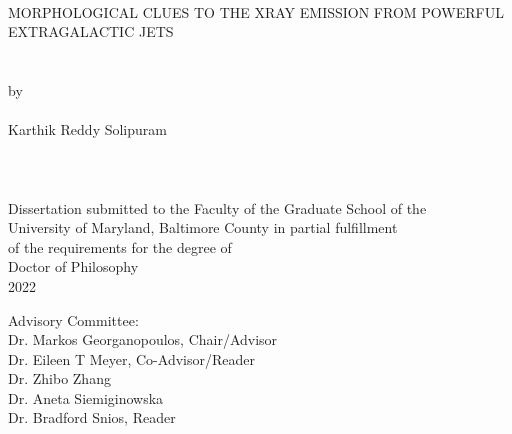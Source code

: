 
\thispagestyle{empty}
\hbox{\ }
\vspace{1in}
\renewcommand{\baselinestretch}{1}
\small\normalsize
\begin{center}

\large{{MORPHOLOGICAL CLUES TO THE XRAY EMISSION FROM POWERFUL EXTRAGALACTIC JETS}}\\
\ \\
\ \\
\large{by} \\
\ \\
\large{Karthik Reddy Solipuram}%
\ \\
\ \\
\ \\
\ \\
\normalsize
Dissertation submitted to the Faculty of the Graduate School of the \\
University of Maryland, Baltimore County in partial fulfillment \\
of the requirements for the degree of \\
Doctor of Philosophy \\
2022
\end{center}

\vspace{7.5em}

\noindent Advisory Committee: \\
Dr. Markos Georganopoulos, Chair/Advisor \\
Dr. Eileen T Meyer, Co-Advisor/Reader \\
Dr. Zhibo Zhang \\
Dr. Aneta Siemiginowska \\
Dr. Bradford Snios, Reader
